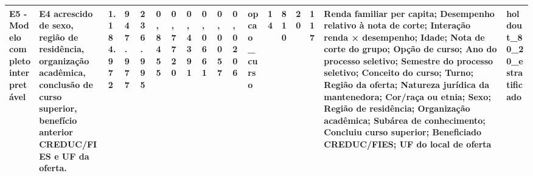 \begin{table}
\begin{tabular}{llllllllllllllllll}
E5 - Modelo completo interpretável & E4 acrescido de sexo, região de residência, organização acadêmica, conclusão de curso superior, benefício anterior CREDUC/FIES e UF da oferta. & 1.184.972 & 947.977 & 236.995 & 0,8455 & 0,7720 & 0,4391 & 0,0661 & 0,0057 & 0,0206 & opcao\_curso & 14 & 810 & 20 & 117 & Renda familiar per capita; Desempenho relativo à nota de corte; Interação renda × desempenho; Idade; Nota de corte do grupo; Opção de curso; Ano do processo seletivo; Semestre do processo seletivo; Conceito do curso; Turno; Região da oferta; Natureza jurídica da mantenedora; Cor/raça ou etnia; Sexo; Região de residência; Organização acadêmica; Subárea de conhecimento; Concluiu curso superior; Beneficiado CREDUC/FIES; UF do local de oferta & holdout\_80\_20\_estratificado \\
\bottomrule
\end{tabular}
\end{table}
